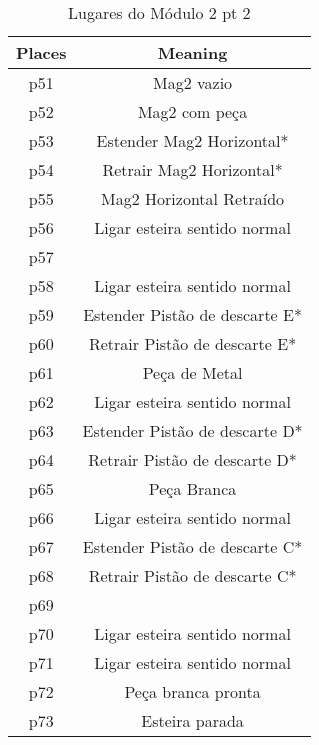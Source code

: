\begin{table}[htbp]
\caption{Lugares do Módulo 2 pt 2}
\centering
\begin{tabular}{c|c}
Places & Meaning\\
\hline
p51 & Mag2 vazio\\
p52 & Mag2 com peça\\
p53 & Estender Mag2 Horizontal*\\
p54 & Retrair Mag2 Horizontal*\\
p55 & Mag2 Horizontal Retraído\\
p56 & Ligar esteira sentido normal\\
p57 & \\
p58 & Ligar esteira sentido normal\\
p59 & Estender Pistão de descarte E*\\
p60 & Retrair Pistão de descarte E*\\
p61 & Peça de Metal\\
p62 & Ligar esteira sentido normal\\
p63 & Estender Pistão de descarte D*\\
p64 & Retrair Pistão de descarte D*\\
p65 & Peça Branca\\
p66 & Ligar esteira sentido normal\\
p67 & Estender Pistão de descarte C*\\
p68 & Retrair Pistão de descarte C*\\
p69 & \\
p70 & Ligar esteira sentido normal\\
p71 & Ligar esteira sentido normal\\
p72 & Peça branca pronta\\
p73 & Esteira parada\\
\end{tabular}
\end{table}

